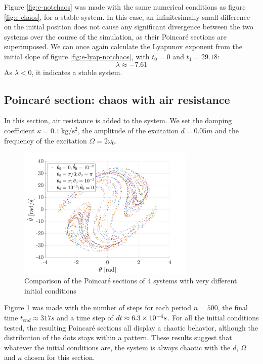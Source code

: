 \documentclass[a4paper,12pt,twoside]{article}
\begin{document}
Figure \ref{fig:e-notchaos} was made with the same numerical conditions as figure \ref{fig:e-chaos}, for a stable system. In this case, an infinitesimally small difference on the initial position does not cause any significant divergence between the two systems over the course of the simulation, as their Poincaré sections are superimposed. We can once again calculate the Lyapunov exponent from the initial slope of figure \ref{fig:e-lyap-notchaos}, with $t_0 = 0$ and $t_1=29.18$:
\begin{equation*}
\lambda \approx -7.61
\end{equation*}
As $\lambda < 0$, it indicates a stable system.\cite{Lyap2}


\subsection{Poincaré section: chaos with air resistance}

In this section, air resistance is added to the system. We set the damping coefficient $\kappa = 0.1 ~ \si{\kg \per \s^2}$, the amplitude of the excitation $d=0.05m$ and the frequency of the excitation $\Omega=2\omega_0$.

\begin{figure}[h]
\centering
	\includegraphics[width=0.75\textwidth]{graphs/f_poincare.png}
	\caption{Comparison of the Poincaré sections of 4 systems with very different initial conditions}
	\label{fig:f-poincare}
\end{figure}

Figure \ref{fig:f-poincare} was made with the number of steps for each period $n=500$, the final time $t_{end} \approx 317 s$ and a time step of $dt \approx \num{6.3d-4} s$. For all the initial conditions tested, the resulting Poincaré sections all display a chaotic behavior, although the distribution of the dots stays within a pattern. These results suggest that whatever the initial conditions are, the system is always chaotic with the $d$, $\Omega$ and $\kappa$ chosen for this section.
\end{document}
